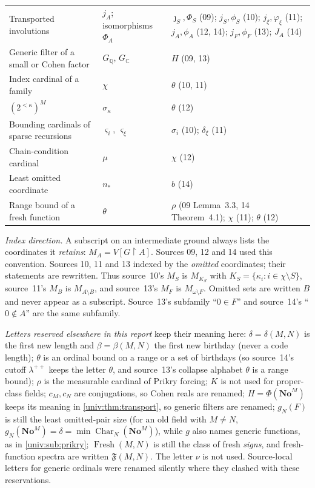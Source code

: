 \documentclass[11pt,letterpaper]{article}
\numberwithin{equation}{section}
\theoremstyle{definition}
\theoremstyle{remark}
\newcommand{\No}{\mathbf{No}}
\newcommand{\NoM}{\No^{M}}
\newcommand{\Fresh}{\operatorname{Fresh}}
\newcommand{\res}{\mathbin{\upharpoonright}}
\newcommand{\Char}{\operatorname{Char}}
\newcommand{\FF}{\mathfrak F}
\begin{document}
\begin{center}
\begin{longtable}{@{}P{0.3\textwidth}P{0.19\textwidth}P{0.43\textwidth}@{}}
Transported involutions & $j_A$; isomorphisms $\Phi_A$ & $\jmath_S,\Phi_S$ (09); $j_S,\phi_S$ (10); $j_\xi,\varphi_\xi$ (11); $j_A,\phi_A$ (12, 14); $j_F,\phi_F$ (13); $J_A$ (14)\\
Generic filter of a small or Cohen factor & $G_{\mathbb Q}$, $G_{\mathbb C}$ & $H$ (09, 13)\\
Index cardinal of a family & $\chi$ & $\theta$ (10, 11)\\
$(2^{<\kappa})^M$ & $\sigma_\kappa$ & $\theta$ (12)\\
Bounding cardinals of sparse recursions & $\varsigma_i$, $\varsigma_\xi$ & $\sigma_i$ (10); $\delta_\xi$ (11)\\
Chain-condition cardinal & $\mu$ & $\chi$ (12)\\
Least omitted coordinate & $n_*$ & $b$ (14)\\
Range bound of a fresh function & $\theta$ & $\rho$ (09 Lemma~3.3, 14 Theorem~4.1); $\chi$ (11); $\theta$ (12)\\
\bottomrule
\end{longtable}
\end{center}

\emph{Index direction.} A subscript on an intermediate ground always lists the
coordinates it \emph{retains}: $M_A=V[G\res A]$. Sources 09, 12 and 14 used this
convention. Sources 10, 11 and 13 indexed by the \emph{omitted} coordinates; their
statements are rewritten. Thus source~10's $M_S$ is $M_{K_S}$ with
$K_S=\{\kappa_i:i\in\chi\setminus S\}$, source~11's $M_B$ is $M_{A\setminus B}$,
and source~13's $M_F$ is $M_{\omega\setminus F}$. Omitted sets are written $B$ and
never appear as a subscript. Source~13's subfamily ``$0\in F$'' and source~14's
``$0\notin A$'' are the same subfamily.

\emph{Letters reserved elsewhere in this report} keep their meaning here:
$\delta=\delta(M,N)$ is the first new length and $\beta=\beta(M,N)$ the first new
birthday (never a code length); $\theta$ is an ordinal bound on a range or a set
of birthdays (so source~14's cutoff $\lambda^{++}$ keeps the letter $\theta$,
and source~13's collapse alphabet $\theta$ is a range bound); $\rho$ is the
measurable cardinal of Prikry forcing; $K$ is not used for proper-class fields;
$c_M,c_N$ are conjugations, so Cohen reals are renamed; $H=\Phi(\NoM)$ keeps its
meaning in \cref{univ:thm:transport}, so generic filters are renamed; $g_N(F)$ is
still the least omitted-pair size (for an old field with $M\ne N$,
$g_N(\NoM)=\delta=\min\Char_N(\NoM)$), while $g$ also names generic functions, as in
\cref{univ:sub:prikry}; $\Fresh(M,N)$ is still the class of fresh \emph{signs},
and fresh-function spectra are written $\FF(M,N)$. The letter $\nu$ is not used.
Source-local letters for generic ordinals were renamed silently where they
clashed with these reservations.
\end{document}
